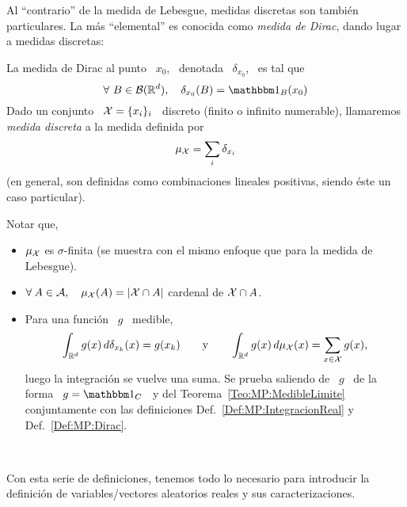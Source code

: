 Al  ``contrario'' de  la medida  de  Lebesgue, medidas  discretas son  tambi\'en
particulares. La  m\'as ``elemental''  es conocida como  {\it medida  de Dirac},
dando lugar a medidas discretas:
%
\begin{definicion}
\label{Def:MP:Dirac}
%
  La medida de Dirac al punto \ $x_0$, \ denotada \ $\delta_{x_0}$, \ es tal que
  \[
  \forall   \  B  \in   \B(\Rset^d),  \quad   \delta_{x_0}(B)  =   \un_B(x_0)
  \]
  Dado un conjunto \ $\mathcal{X} = \{  x_i \}_i$ \ discreto (finito o infinito numerable),
  llamaremos {\it medida discreta} a la medida definida por
  \[
  \mu_{\mathcal{X}} = \sum_i \delta_{x_i}
  \]
  (en  general,  son definidas  como  combinaciones  lineales positivas,  siendo
  \'este un caso particular).
\end{definicion}
%
Notar que,
%
\begin{itemize}
%
\item $\mu_{\mathcal{X}}$ es  $\sigma$-finita (se muestra con el mismo  enfoque que para la
  medida de Lebesgue).
%
\item $\forall  \: A \in \mathcal{A},  \quad \mu_{\mathcal{X}}(A) =  |\mathcal{X} \cap A|$ cardenal de $\mathcal{X} \cap A$.
%
\item Para una funci\'on \ $g$ \ medible,
  \[
  \int_{\mathbb{R}^d} g(x) \, d\delta_{x_k}(x) = g(x_k) \qquad \mbox{y} \qquad
  \int_{\mathbb{R}^d} g(x) \, d\mu_{\mathcal{X}}(x) = \sum_{x \in \mathcal{X}} g(x),
  \]
  luego la integraci\'on se  vuelve una suma.  Se prueba saliendo de  \ $g$ \ de
  la   forma  \  $g   =  \un_C$   \  y   del  Teorema~\ref{Teo:MP:MedibleLimite}
  conjuntamente   con  las   definiciones   Def.~\ref{Def:MP:IntegracionReal}  y
  Def.~\ref{Def:MP:Dirac}.
\end{itemize}

\

Con esta  serie de  definiciones, tenemos todo  lo necesario para  introducir la
definici\'on de variables/vectores aleatorios reales y sus caracterizaciones.



\label{Ssec:MP:VAGeneral}

